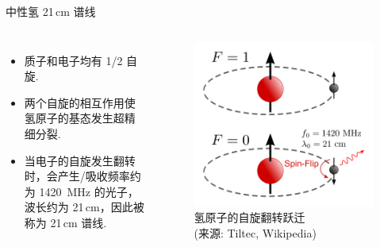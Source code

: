 \documentclass{beamer}
\begin{document}
\begin{frame}{中性氢 21\texorpdfstring{\,}{ }cm 谱线}
  \begin{columns}
    \begin{itemize}
      \item 质子和电子均有 1/2 自旋.
      \item 两个自旋的相互作用使氢原子的基态发生\alert{超精细分裂}.
      \item 当电子的自旋发生翻转时，会产生/吸收频率约为 \SI{1420}{\MHz} 的光子，
        波长约为 21\,cm，因此被称为 \alert{21\,cm 谱线}.
    \end{itemize}

    \begin{figure}
      \centering
      \includegraphics[width=\columnwidth]{hydrogen-spinflip}
      \caption{氢原子的自旋翻转跃迁\\(来源: Tiltec, Wikipedia)}
    \end{figure}
  \end{columns}
\end{frame}
\end{document}
